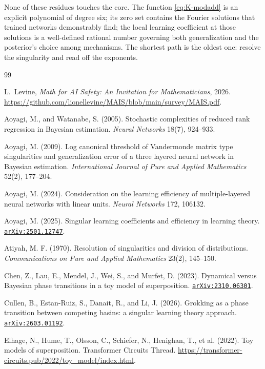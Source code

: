 \documentclass[11pt]{amsart}
\newcommand{\arxiv}[1]{\href{https://arxiv.org/abs/#1}{\texttt{arXiv:#1}}}
\theoremstyle{plain}
\theoremstyle{definition}
\begin{document}
None of these residues touches the core. The function \eqref{eq:K-modadd} is an explicit polynomial of degree six; its zero set contains the Fourier solutions that trained networks demonstrably find; the local learning coefficient at those solutions is a well-defined rational number governing both generalization and the posterior's choice among mechanisms. The shortest path is the oldest one: resolve the singularity and read off the exponents.

\begin{thebibliography}{99}

L.~Levine,
\emph{Math for AI Safety: An Invitation for Mathematicians},
2026. \url{https://github.com/lionellevine/MAIS/blob/main/survey/MAIS.pdf}.


Aoyagi, M., and Watanabe, S. (2005). Stochastic complexities of reduced rank regression in Bayesian estimation. \emph{Neural Networks} 18(7), 924--933.

Aoyagi, M. (2009). Log canonical threshold of Vandermonde matrix type singularities and generalization error of a three layered neural network in Bayesian estimation. \emph{International Journal of Pure and Applied Mathematics} 52(2), 177--204.

Aoyagi, M. (2024). Consideration on the learning efficiency of multiple-layered neural networks with linear units. \emph{Neural Networks} 172, 106132.

Aoyagi, M. (2025). Singular learning coefficients and efficiency in learning theory. \arxiv{2501.12747}.

Atiyah, M. F. (1970). Resolution of singularities and division of distributions. \emph{Communications on Pure and Applied Mathematics} 23(2), 145--150.

Chen, Z., Lau, E., Mendel, J., Wei, S., and Murfet, D. (2023). Dynamical versus Bayesian phase transitions in a toy model of superposition. \arxiv{2310.06301}.

Cullen, B., Estan-Ruiz, S., Danait, R., and Li, J. (2026). Grokking as a phase transition between competing basins: a singular learning theory approach. \arxiv{2603.01192}.

Elhage, N., Hume, T., Olsson, C., Schiefer, N., Henighan, T., et al. (2022). Toy models of superposition. Transformer Circuits Thread. \url{https://transformer-circuits.pub/2022/toy_model/index.html}.


\end{thebibliography}
\end{document}
